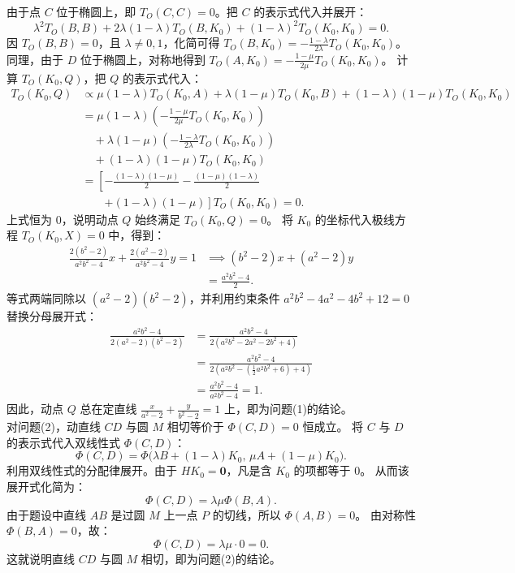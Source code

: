 \begin{solution}
由于点 $C$ 位于椭圆上，即 $T_O(C, C) = 0$。把 $C$ 的表示式代入并展开：
\[ \lambda^2 T_O(B, B) + 2\lambda(1-\lambda) T_O(B, K_0) + (1-\lambda)^2 T_O(K_0, K_0) = 0. \]
因 $T_O(B, B) = 0$，且 $\lambda \neq 0, 1$，化简可得 $T_O(B, K_0) = -\frac{1-\lambda}{2\lambda} T_O(K_0, K_0)$。
同理，由于 $D$ 位于椭圆上，对称地得到 $T_O(A, K_0) = -\frac{1-\mu}{2\mu} T_O(K_0, K_0)$。
计算 $T_O(K_0, Q)$，把 $Q$ 的表示式代入：
\begin{align*}
T_O(K_0, Q) &\propto \mu(1-\lambda) T_O(K_0, A) + \lambda(1-\mu) T_O(K_0, B) + (1-\lambda)(1-\mu) T_O(K_0, K_0) \\
&= \mu(1-\lambda) \left(-\frac{1-\mu}{2\mu} T_O(K_0, K_0)\right) \\
&\quad + \lambda(1-\mu) \left(-\frac{1-\lambda}{2\lambda} T_O(K_0, K_0)\right) \\
&\quad + (1-\lambda)(1-\mu) T_O(K_0, K_0) \\
&= \left[ -\frac{(1-\lambda)(1-\mu)}{2} - \frac{(1-\mu)(1-\lambda)}{2} \right. \\
&\qquad \left. + (1-\lambda)(1-\mu) \right] T_O(K_0, K_0) = 0.
\end{align*}
上式恒为 $0$，说明动点 $Q$ 始终满足 $T_O(K_0, Q) = 0$。
将 $K_0$ 的坐标代入极线方程 $T_O(K_0, X) = 0$ 中，得到：
\[
\begin{aligned}
\frac{2(b^2-2)}{a^2b^2-4} x + \frac{2(a^2-2)}{a^2b^2-4} y = 1
&\implies (b^2-2)x + (a^2-2)y \\
&= \frac{a^2b^2-4}{2}.
\end{aligned}
\]
等式两端同除以 $(a^2-2)(b^2-2)$，并利用约束条件 $a^2b^2 - 4a^2 - 4b^2 + 12 = 0$ 替换分母展开式：
\[
\begin{aligned}
\frac{a^2b^2-4}{2(a^2-2)(b^2-2)}
&= \frac{a^2b^2-4}{2(a^2b^2 - 2a^2 - 2b^2 + 4)} \\
&= \frac{a^2b^2-4}{2(a^2b^2 - (\frac{1}{2}a^2b^2 + 6) + 4)} \\
&= \frac{a^2b^2-4}{a^2b^2-4} = 1.
\end{aligned}
\]
因此，动点 $Q$ 总在定直线 $\frac{x}{a^2-2} + \frac{y}{b^2-2} = 1$ 上，即为问题(1)的结论。\\
对问题(2)，动直线 $CD$ 与圆 $M$ 相切等价于 $\Phi(C, D) = 0$ 恒成立。
将 $C$ 与 $D$ 的表示式代入双线性式 $\Phi(C, D)$：
\[ \Phi(C, D) = \Phi\big(\lambda B + (1-\lambda) K_0, \, \mu A + (1-\mu) K_0\big). \]
利用双线性式的分配律展开。由于 $H K_0 = \mathbf{0}$，凡是含 $K_0$ 的项都等于 $0$。
从而该展开式化简为：
\[ \Phi(C, D) = \lambda \mu \Phi(B, A). \]
由于题设中直线 $AB$ 是过圆 $M$ 上一点 $P$ 的切线，所以 $\Phi(A, B) = 0$。
由对称性 $\Phi(B, A) = 0$，故：
\[ \Phi(C, D) = \lambda \mu \cdot 0 = 0. \]
这就说明直线 $CD$ 与圆 $M$ 相切，即为问题(2)的结论。
\end{solution}


